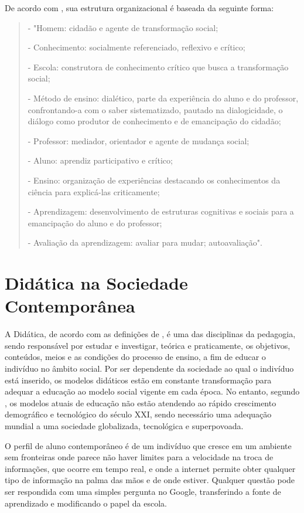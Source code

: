 De acordo com \cite{larchert}, sua estrutura organizacional é baseada da seguinte forma:
\begin{quote}- "Homem: cidadão e agente de transformação social;
	
- Conhecimento: socialmente referenciado, reflexivo e crítico;

- Escola: construtora de conhecimento crítico que busca a transformação social;

- Método de ensino: dialético, parte da experiência do aluno e do professor, confrontando-a com o saber sistematizado, pautado na dialogicidade, o diálogo como produtor de conhecimento e de emancipação do cidadão;

- Professor: mediador, orientador e agente de mudança social;

- Aluno: aprendiz participativo e crítico;

- Ensino: organização de experiências destacando os conhecimentos da ciência para explicá-las criticamente;

- Aprendizagem: desenvolvimento de estruturas cognitivas e sociais para a emancipação do aluno e do professor;

- Avaliação da aprendizagem: avaliar para mudar; autoavaliação".
\end{quote}
\section{Didática na Sociedade Contemporânea}\label{sec:didatica_sociedade_cont}
A Didática, de acordo com as definições de \cite{libaneo}, é uma das disciplinas da pedagogia, sendo responsável por estudar e investigar, teórica e praticamente, os objetivos, conteúdos, meios e as condições do processo de ensino, a fim de educar o indivíduo no âmbito social. Por ser dependente da sociedade ao qual o indivíduo está inserido, os modelos didáticos estão em constante transformação para adequar a educação ao modelo social vigente em cada época. No entanto, segundo \cite{al-mufti}, os modelos atuais de educação não estão atendendo ao rápido crescimento demográfico e tecnológico do século XXI, sendo necessário uma adequação mundial a uma sociedade globalizada, tecnológica e superpovoada. 

O perfil de aluno contemporâneo é de um indivíduo que cresce em um ambiente sem fronteiras onde parece não haver limites para a velocidade na troca de informações, que ocorre em tempo real, e onde a internet  permite obter qualquer tipo de informação na palma das mãos e de onde estiver. Qualquer questão pode ser respondida com uma simples pergunta no Google, transferindo a fonte de aprendizado e modificando o papel da escola. 


